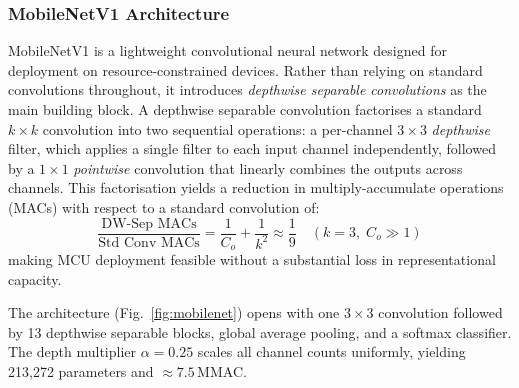 \documentclass[conference]{IEEEtran}
\begin{document}
\subsubsection{MobileNetV1 Architecture}

MobileNetV1 \cite{mobilenet} is a lightweight convolutional neural
network designed for deployment on resource-constrained devices. Rather
than relying on standard convolutions throughout, it introduces
\emph{depthwise separable convolutions} as the main building block. A
depthwise separable convolution factorises a standard $k{\times}k$
convolution into two sequential operations: a per-channel $3{\times}3$
\emph{depthwise} filter, which applies a single filter to each input
channel independently, followed by a $1{\times}1$ \emph{pointwise}
convolution that linearly combines the outputs across channels. This
factorisation yields a reduction in multiply-accumulate operations
(MACs) with respect to a standard convolution of:
\begin{equation}
  \frac{\text{DW-Sep MACs}}{\text{Std Conv MACs}}
  = \frac{1}{C_o} + \frac{1}{k^2}
  \approx \frac{1}{9} \quad (k{=}3,\; C_o \gg 1)
  \label{eq:dwsep}
\end{equation}
making MCU deployment feasible without a substantial loss in
representational capacity.

The architecture (Fig.~\ref{fig:mobilenet}) opens with one $3{\times}3$
convolution followed by 13 depthwise separable blocks, global average
pooling, and a softmax classifier. The depth multiplier $\alpha\!=\!0.25$
scales all channel counts uniformly, yielding 213{,}272 parameters and
${\approx}7.5$\,MMAC.
\end{document}
